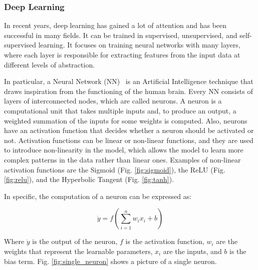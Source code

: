 \subsubsection{Deep Learning}
\label{subsubsec:dl}
In recent years, deep learning has gained a lot of attention and has been successful in many fields.
It can be trained in supervised, unsupervised, and self-supervised learning.
It focuses on training neural networks with many layers, where each layer is responsible for extracting features from the input data at different levels of abstraction.

In particular, a Neural Network (NN)~\citep{rumelhart1986learning} is an Artificial Intelligence technique that draws inspiration from the functioning of the human brain.
Every NN consists of layers of interconnected nodes, which are called neurons.
A neuron is a computational unit that takes multiple inputs and, to produce an output, a weighted summation of the inputs for some weights is computed.
Also, neurons have an activation function that decides whether a neuron should be activated or not.
Activation functions can be linear or non-linear functions, and they are used to introduce non-linearity in the model, which allows the model to learn more complex patterns in the data rather than linear ones.
Examples of non-linear activation functions are the Sigmoid (Fig. \ref{fig:sigmoid}), the ReLU (Fig. \ref{fig:relu}), and the Hyperbolic Tangent (Fig. \ref{fig:tanh}).

In specific, the computation of a neuron can be expressed as:

\begin{equation}
    \dot{y} = f(\sum_{i=1}^{n} w_i x_i + b)\label{eq:neuron}
\end{equation}

Where $\dot{y}$ is the output of the neuron, $f$ is the activation function, $w_i$ are the weights that represent the learnable parameters, $x_i$ are the inputs, and $b$ is the bias term.
Fig. \ref{fig:single_neuron} shows a picture of a single neuron.



